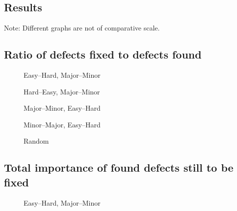 \documentclass[a4paper,10pt]{article}
\begin{document}
\clearpage
\begin{appendices}
  \section{Results}
Note: Different graphs are not of comparative scale.

  \subsection{Ratio of defects fixed to defects found}
  
  \begin{figure}[!htb]
    \centering
    
    \caption{Easy--Hard, Major--Minor}
  \end{figure}
  
  \begin{figure}[!htb]
    \centering
    
    \caption{Hard--Easy, Major--Minor}
  \end{figure}
  
  \begin{figure}[!htb]
    \centering
    
    \caption{Major--Minor, Easy--Hard}
  \end{figure}
  
  \begin{figure}[!htb]
    \centering
    
    \caption{Minor--Major, Easy--Hard}
  \end{figure}
  
  \begin{figure}[!htb]
    \centering
    
    \caption{Random}
  \end{figure}

  
    
  \clearpage
  \subsection{Total importance of found defects still to be fixed}
  \begin{figure}[!htb]
    \centering
    
    \caption{Easy--Hard, Major--Minor}
  \end{figure}
  

\end{appendices}
\end{document}

